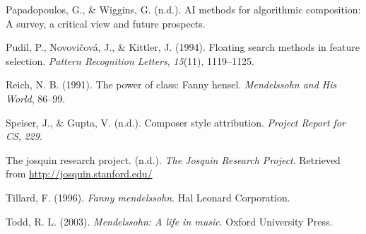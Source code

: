 \documentclass[12pt,twoside]{reedthesis}
\theoremstyle{definition}
\theoremstyle{definition}
\theoremstyle{definition}
\theoremstyle{remark}
\begin{document}
\hypertarget{ref-papadopoulosai}{}
Papadopoulos, G., \& Wiggins, G. (n.d.). AI methods for algorithmic
composition: A survey, a critical view and future prospects.

\hypertarget{ref-pudil1994floating}{}
Pudil, P., Novovičová, J., \& Kittler, J. (1994). Floating search
methods in feature selection. \emph{Pattern Recognition Letters},
\emph{15}(11), 1119--1125.

\hypertarget{ref-reich1991}{}
Reich, N. B. (1991). The power of class: Fanny hensel. \emph{Mendelssohn
and His World}, 86--99.

\hypertarget{ref-CompStyleAttri}{}
Speiser, J., \& Gupta, V. (n.d.). Composer style attribution.
\emph{Project Report for CS}, \emph{229}.

\hypertarget{ref-jrp}{}
The josquin research project. (n.d.). \emph{The Josquin Research
Project}. Retrieved from \url{http://josquin.stanford.edu/}

\hypertarget{ref-tillard1996}{}
Tillard, F. (1996). \emph{Fanny mendelssohn}. Hal Leonard Corporation.

\hypertarget{ref-todd2003}{}
Todd, R. L. (2003). \emph{Mendelssohn: A life in music}. Oxford
University Press.


\end{document}
